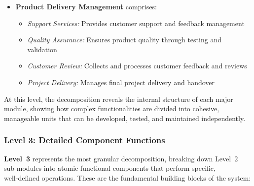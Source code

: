 \documentclass[12pt,a4paper]{article}
\begin{document}
\begin{itemize}
    \item \textbf{Product Delivery Management} comprises:
    \begin{itemize}
        \item \textit{Support Services:} Provides customer support and feedback management
        \item \textit{Quality Assurance:} Ensures product quality through testing and validation
        \item \textit{Customer Review:} Collects and processes customer feedback and reviews
        \item \textit{Project Delivery:} Manages final project delivery and handover
    \end{itemize}
\end{itemize}

At this level, the decomposition reveals the internal structure of each major module, showing how complex functionalities are divided into cohesive, manageable units that can be developed, tested, and maintained independently.

\subsubsection{Level 3: Detailed Component Functions}
\textbf{Level~3} represents the most granular decomposition, breaking down Level~2 sub‑modules into atomic functional components that perform specific, well‑defined operations.  These are the fundamental building blocks of the system:
\end{document}
